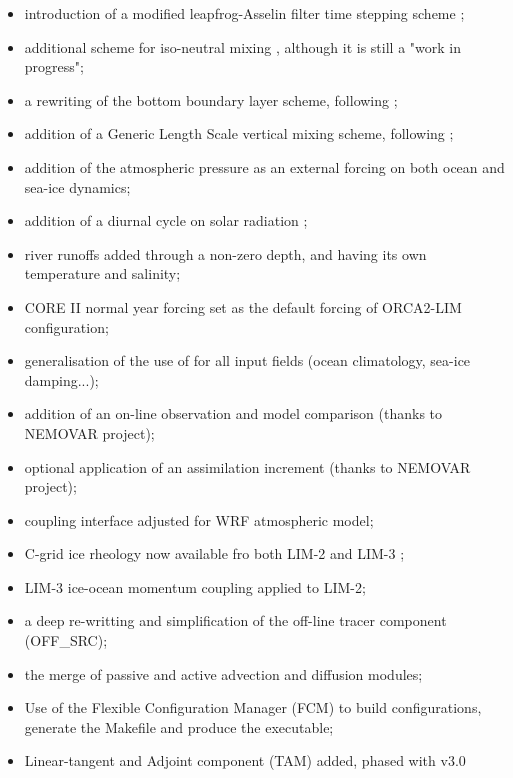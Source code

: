 \documentclass[../main/NEMO_manual]{subfiles}
\begin{document}
\begin{itemize}
\item
  introduction of a modified leapfrog-Asselin filter time stepping scheme
  \citep{Leclair_Madec_OM09}; 
\item
  additional scheme for iso-neutral mixing \citep{Griffies_al_JPO98}, although it is still a "work in progress";
\item
  a rewriting of the bottom boundary layer scheme, following \citet{Campin_Goosse_Tel99};
\item
  addition of a Generic Length Scale vertical mixing scheme, following \citet{Umlauf_Burchard_JMS03};
\item
  addition of the atmospheric pressure as an external forcing on both ocean and sea-ice dynamics;
\item
  addition of a diurnal cycle on solar radiation \citep{Bernie_al_CD07};
\item
  river runoffs added through a non-zero depth, and having its own temperature and salinity;
\item
  CORE II normal year forcing set as the default forcing of ORCA2-LIM configuration;
\item
  generalisation of the use of  for all input fields (ocean climatology, sea-ice damping...);
\item
  addition of an on-line observation and model comparison (thanks to NEMOVAR project);
\item
  optional application of an assimilation increment (thanks to NEMOVAR project);
\item
  coupling interface adjusted for WRF atmospheric model;
\item
  C-grid ice rheology now available fro both LIM-2 and LIM-3 \citep{Bouillon_al_OM09};
\item
  LIM-3 ice-ocean momentum coupling applied to LIM-2;
\item
  a deep re-writting and simplification of the off-line tracer component (OFF\_SRC);
\item
  the merge of passive and active advection and diffusion modules;
\item
  Use of the Flexible Configuration Manager (FCM) to build configurations,
  generate the Makefile and produce the executable;
\item
  Linear-tangent and Adjoint component (TAM) added, phased with v3.0
\end{itemize}

\vspace{1cm}
\end{document}
